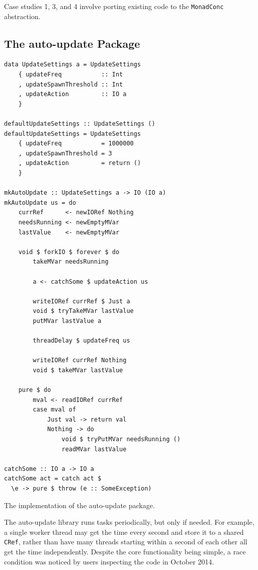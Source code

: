 Case studies 1, 3, and 4 involve porting existing code to the
\verb|MonadConc| abstraction.

\subsection{The auto-update Package}

\begin{listing}
  \centering
  \begin{minipage}{0.5\textwidth}
  \begin{verbatim}
data UpdateSettings a = UpdateSettings
    { updateFreq           :: Int
    , updateSpawnThreshold :: Int
    , updateAction         :: IO a
    }

defaultUpdateSettings :: UpdateSettings ()
defaultUpdateSettings = UpdateSettings
    { updateFreq           = 1000000
    , updateSpawnThreshold = 3
    , updateAction         = return ()
    }

mkAutoUpdate :: UpdateSettings a -> IO (IO a)
mkAutoUpdate us = do
    currRef      <- newIORef Nothing
    needsRunning <- newEmptyMVar
    lastValue    <- newEmptyMVar

    void $ forkIO $ forever $ do
        takeMVar needsRunning

        a <- catchSome $ updateAction us

        writeIORef currRef $ Just a
        void $ tryTakeMVar lastValue
        putMVar lastValue a

        threadDelay $ updateFreq us

        writeIORef currRef Nothing
        void $ takeMVar lastValue

    pure $ do
        mval <- readIORef currRef
        case mval of
            Just val -> return val
            Nothing -> do
                void $ tryPutMVar needsRunning ()
                readMVar lastValue

catchSome :: IO a -> IO a
catchSome act = catch act $
  \e -> pure $ throw (e :: SomeException)
  \end{verbatim}
  \end{minipage}
  \caption{The implementation of the auto-update package.}\label{lst:example-autoupdate}
\end{listing}

The auto-update\cite{auto_update} library runs tasks periodically, but
only if needed.  For example, a single worker thread may get the time
every second and store it to a shared \verb|CRef|, rather than have
many threads starting within a second of each other all get the time
independently.  Despite the core functionality being simple, a race
condition was noticed by users inspecting the code in October 2014.

